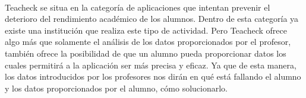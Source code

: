 \paragraph{} Teacheck se situa en la categoría de aplicaciones que intentan prevenir el deterioro del rendimiento académico de los alumnos. Dentro de esta categoría ya existe una institución que realiza este tipo de actividad. Pero Teacheck ofrece algo más que solamente el análisis de los datos proporcionados por el profesor, también ofrece la posibilidad de que un alumno pueda proporcionar datos los cuales permitirá a la aplicación ser más precisa y eficaz.
Ya que de esta manera, los datos introducidos por los profesores nos dirán en qué está fallando el alumno y los datos proporcionados por el alumno, cómo solucionarlo.




































